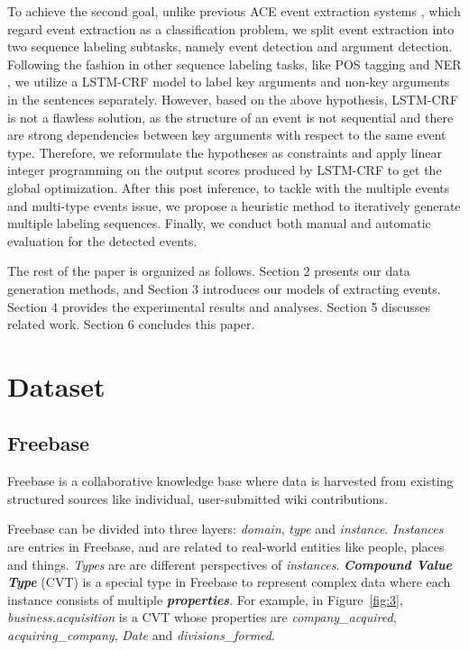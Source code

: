 \documentclass{article}
\begin{document}
To achieve the second goal, unlike previous ACE event extraction systems \cite{li2013joint,chen2015event}, which regard event extraction as a classification problem, we split event extraction into two sequence labeling subtasks, namely event detection and argument detection. Following the fashion in other sequence labeling tasks, like POS tagging and NER \cite{huang2015bidirectional,lample2016neural}, we utilize a LSTM-CRF model to label key arguments and non-key arguments in the sentences separately. However, based on the above hypothesis, LSTM-CRF is not a flawless solution, as the structure of an event is not sequential and there are strong dependencies between key arguments with respect to the same event type. Therefore, we reformulate the hypotheses as constraints and apply linear integer programming on the output scores produced by LSTM-CRF to get the global optimization. After this post inference, to tackle with the multiple events and multi-type events issue, we propose a heuristic method to iteratively generate multiple labeling sequences. Finally, we conduct both manual and automatic evaluation for the detected events.

The rest of the paper is organized as follows. Section 2 presents our data generation methods, and Section 3 introduces our models of extracting events. Section 4 provides the experimental results and analyses. Section 5 discusses related work. Section 6 concludes this paper.

\section{Dataset}
\subsection{Freebase}
Freebase\cite{bollacker2008freebase} is a collaborative knowledge base where data is harvested from existing structured sources like individual, user-submitted wiki contributions.

Freebase can be divided into three layers: \emph{domain}, \emph{type} and \emph{instance}. \emph{Instances} are entries in Freebase, and are related to real-world entities like people, places and things. \emph{Types} are are different perspectives of \emph{instances}. 
\textbf{\emph{Compound Value Type}} (CVT) is a special type in Freebase to represent complex data where each instance consists of multiple \textbf{\emph{properties}}. For example, in Figure~\ref{fig:3}, \emph{business.acquisition} is a CVT whose properties are \emph{company\_acquired}, \emph{acquiring\_company}, \emph{Date} and \emph{divisions\_formed}. 
\end{document}
